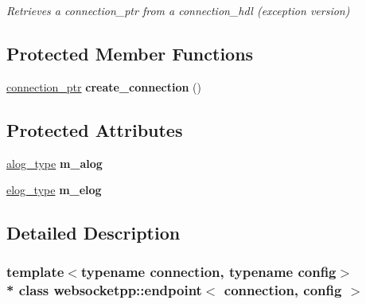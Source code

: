 \begin{DoxyCompactItemize}
\begin{DoxyCompactList}\small\item\em Retrieves a connection\+\_\+ptr from a connection\+\_\+hdl (exception version) \end{DoxyCompactList}\end{DoxyCompactItemize}
\subsection*{Protected Member Functions}
\begin{DoxyCompactItemize}
\item 
\hyperlink{classwebsocketpp_1_1endpoint_aa90d289d870c500be228ee1dea75b8b2}{connection\+\_\+ptr} {\bfseries create\+\_\+connection} ()\hypertarget{classwebsocketpp_1_1endpoint_abfbee4cb244700560ef80594a913cd95}{}\label{classwebsocketpp_1_1endpoint_abfbee4cb244700560ef80594a913cd95}

\end{DoxyCompactItemize}
\subsection*{Protected Attributes}
\begin{DoxyCompactItemize}
\item 
\hyperlink{classwebsocketpp_1_1endpoint_a1ca2ad5bfdd241a031746c3f158f4003}{alog\+\_\+type} {\bfseries m\+\_\+alog}\hypertarget{classwebsocketpp_1_1endpoint_ab77acb19adafe52f5c28aa387077cfbc}{}\label{classwebsocketpp_1_1endpoint_ab77acb19adafe52f5c28aa387077cfbc}

\item 
\hyperlink{classwebsocketpp_1_1endpoint_a4ab98f4fed5b5b2740105eff732c7b1e}{elog\+\_\+type} {\bfseries m\+\_\+elog}\hypertarget{classwebsocketpp_1_1endpoint_a46d6afb6f4f1541da167230c8c1e6f9a}{}\label{classwebsocketpp_1_1endpoint_a46d6afb6f4f1541da167230c8c1e6f9a}

\end{DoxyCompactItemize}


\subsection{Detailed Description}
\subsubsection*{template$<$typename connection, typename config$>$\\*
class websocketpp\+::endpoint$<$ connection, config $>$}

